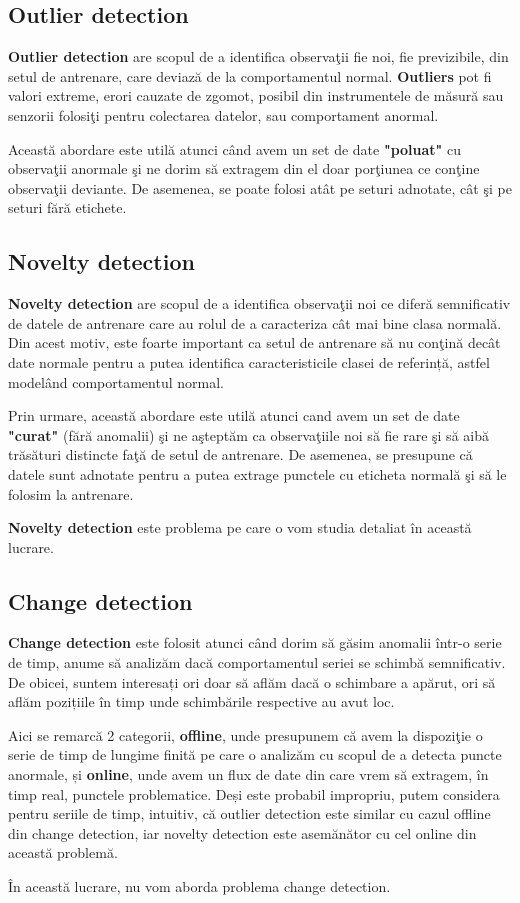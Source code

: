 \subsection{Outlier detection}

\textbf{Outlier detection} are scopul de a identifica observaţii fie noi,
fie previzibile, din setul de antrenare, care deviază de la 
comportamentul normal. 
\textbf{Outliers} pot fi valori extreme, erori cauzate 
de zgomot, posibil din instrumentele de măsură sau senzorii folosiţi 
pentru colectarea datelor, sau comportament anormal.

Această abordare este utilă atunci când avem un set de date \textbf{"poluat"} cu 
observaţii anormale şi ne dorim să extragem din el doar porţiunea ce conţine 
observaţii deviante. De asemenea, se poate folosi atât pe seturi adnotate, cât 
şi pe seturi fără etichete.

\subsection{Novelty detection}

\textbf{Novelty detection} are scopul de a identifica observaţii noi 
ce diferă semnificativ de datele de antrenare care au rolul de a 
caracteriza cât mai bine clasa normală. Din acest motiv, este foarte 
important ca setul de antrenare să nu conţină
decât date normale pentru a putea identifica caracteristicile clasei de referință,
astfel modelând comportamentul normal.

Prin urmare, această abordare este utilă atunci cand avem un 
set de date \textbf{"curat"} (fără 
anomalii) şi ne aşteptăm ca observaţiile noi să fie rare şi să aibă trăsături
distincte faţă de setul de antrenare. De asemenea, se presupune că datele sunt adnotate 
pentru a putea extrage punctele cu eticheta normală şi să le folosim la antrenare.

\textbf{Novelty detection} este problema pe care o vom studia detaliat în 
această lucrare.

\subsection{Change detection}

\textbf{Change detection} este folosit atunci când dorim să găsim anomalii 
într-o serie de timp, anume să analizăm dacă 
comportamentul seriei se schimbă semnificativ. De obicei, suntem interesați 
ori doar să aflăm dacă o schimbare a apărut, ori să aflăm pozițiile 
în timp unde schimbările respective au avut loc.

Aici se remarcă 2 categorii, \textbf{offline}, 
unde presupunem că avem la dispoziţie 
o serie de timp de lungime finită pe care o analizăm cu scopul de a 
detecta puncte anormale, și \textbf{online}, unde avem un flux de date din 
care vrem să extragem, în timp real, punctele problematice. Deși este probabil 
impropriu, putem considera pentru seriile de timp, intuitiv, că outlier detection este similar 
cu cazul offline din change detection, iar novelty detection este asemănător 
cu cel online din această problemă.

În această lucrare, nu vom aborda problema change detection.